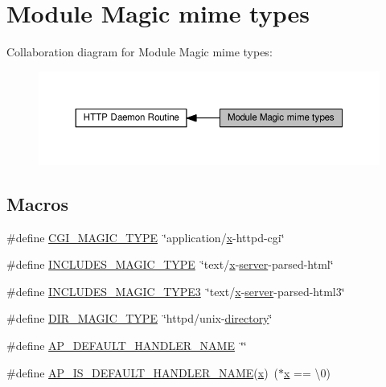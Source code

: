 \hypertarget{group__module__magic}{}\section{Module Magic mime types}
\label{group__module__magic}
Collaboration diagram for Module Magic mime types\+:
\nopagebreak
\begin{figure}[H]
\begin{center}
\leavevmode
\includegraphics[width=350pt]{group__module__magic}
\end{center}
\end{figure}
\subsection*{Macros}
\begin{DoxyCompactItemize}
\item 
\#define \hyperlink{group__module__magic_gad3207ba2e5e874a218a355eaf0877643}{C\+G\+I\+\_\+\+M\+A\+G\+I\+C\+\_\+\+T\+Y\+PE}~\char`\"{}application/\hyperlink{pcregrep_8txt_a4242e9148f20c002763bf4ba53b26ad6}{x}-\/httpd-\/cgi\char`\"{}
\item 
\#define \hyperlink{group__module__magic_gac5a920125c7b78ceaaef16f37a8565c6}{I\+N\+C\+L\+U\+D\+E\+S\+\_\+\+M\+A\+G\+I\+C\+\_\+\+T\+Y\+PE}~\char`\"{}text/\hyperlink{pcregrep_8txt_a4242e9148f20c002763bf4ba53b26ad6}{x}-\/\hyperlink{group__APR__Util__RC_ga48a1618bc9e57e0406979ef034512520}{server}-\/parsed-\/html\char`\"{}
\item 
\#define \hyperlink{group__module__magic_ga37aaf2dbe19ca4894dc31bf873b1861a}{I\+N\+C\+L\+U\+D\+E\+S\+\_\+\+M\+A\+G\+I\+C\+\_\+\+T\+Y\+P\+E3}~\char`\"{}text/\hyperlink{pcregrep_8txt_a4242e9148f20c002763bf4ba53b26ad6}{x}-\/\hyperlink{group__APR__Util__RC_ga48a1618bc9e57e0406979ef034512520}{server}-\/parsed-\/html3\char`\"{}
\item 
\#define \hyperlink{group__module__magic_ga4f329be3fb523b9e986cb13480ba9990}{D\+I\+R\+\_\+\+M\+A\+G\+I\+C\+\_\+\+T\+Y\+PE}~\char`\"{}httpd/unix-\/\hyperlink{pcregrep_8txt_ac33d049ccd70185ffba7bed3d06d9ea2}{directory}\char`\"{}
\item 
\#define \hyperlink{group__module__magic_gae0c36b43b75c33f4d1d9fb501221ec20}{A\+P\+\_\+\+D\+E\+F\+A\+U\+L\+T\+\_\+\+H\+A\+N\+D\+L\+E\+R\+\_\+\+N\+A\+ME}~\char`\"{}\char`\"{}
\item 
\#define \hyperlink{group__module__magic_gac3c80cd5f9050df44f87345cc4980e5e}{A\+P\+\_\+\+I\+S\+\_\+\+D\+E\+F\+A\+U\+L\+T\+\_\+\+H\+A\+N\+D\+L\+E\+R\+\_\+\+N\+A\+ME}(\hyperlink{pcregrep_8txt_a4242e9148f20c002763bf4ba53b26ad6}{x})~($\ast$\hyperlink{pcregrep_8txt_a4242e9148f20c002763bf4ba53b26ad6}{x} == \textquotesingle{}\textbackslash{}0\textquotesingle{})
\end{DoxyCompactItemize}


